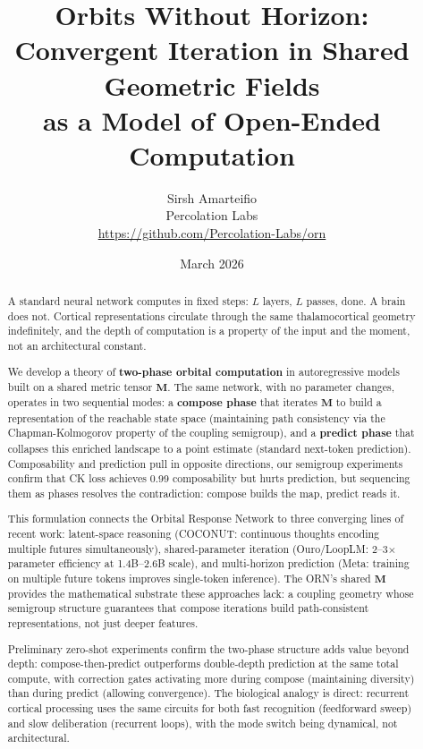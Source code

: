 \documentclass[11pt, a4paper]{article}
\title{%
    \textbf{Orbits Without Horizon:}\\[4pt]
    \Large Convergent Iteration in Shared Geometric Fields\\[2pt]
    \large as a Model of Open-Ended Computation%
}
\author{%
    Sirsh Amarteifio\\
    {\small Percolation Labs}\\
    {\small \url{https://github.com/Percolation-Labs/orn}}%
}
\date{March 2026 \quad{\small\textnormal{,  Early Draft}}}
\newcommand{\M}{\mathbf{M}}
\theoremstyle{plain}
\theoremstyle{definition}
\theoremstyle{remark}
\begin{document}
\maketitle

\begin{abstract}
A standard neural network computes in fixed steps: $L$ layers, $L$ passes, done.
A brain does not.
Cortical representations circulate through the same thalamocortical geometry indefinitely, and the depth of computation is a property of the input and the moment, not an architectural constant.

We develop a theory of \textbf{two-phase orbital computation} in autoregressive models built on a shared metric tensor $\M$.
The same network, with no parameter changes, operates in two sequential modes:
a \textbf{compose phase} that iterates $\M$ to build a representation of the reachable state space (maintaining path consistency via the Chapman-Kolmogorov property of the coupling semigroup),
and a \textbf{predict phase} that collapses this enriched landscape to a point estimate (standard next-token prediction).
Composability and prediction pull in opposite directions, our semigroup experiments confirm that CK loss achieves 0.99 composability but hurts prediction, but sequencing them as phases resolves the contradiction: compose builds the map, predict reads it.

This formulation connects the Orbital Response Network to three converging lines of recent work:
latent-space reasoning (COCONUT: continuous thoughts encoding multiple futures simultaneously),
shared-parameter iteration (Ouro/LoopLM: 2--3$\times$ parameter efficiency at 1.4B--2.6B scale),
and multi-horizon prediction (Meta: training on multiple future tokens improves single-token inference).
The ORN's shared $\M$ provides the mathematical substrate these approaches lack: a coupling geometry whose semigroup structure guarantees that compose iterations build path-consistent representations, not just deeper features.

Preliminary zero-shot experiments confirm the two-phase structure adds value beyond depth: compose-then-predict outperforms double-depth prediction at the same total compute, with correction gates activating more during compose (maintaining diversity) than during predict (allowing convergence).
The biological analogy is direct: recurrent cortical processing uses the same circuits for both fast recognition (feedforward sweep) and slow deliberation (recurrent loops), with the mode switch being dynamical, not architectural.
\end{abstract}
\end{document}
